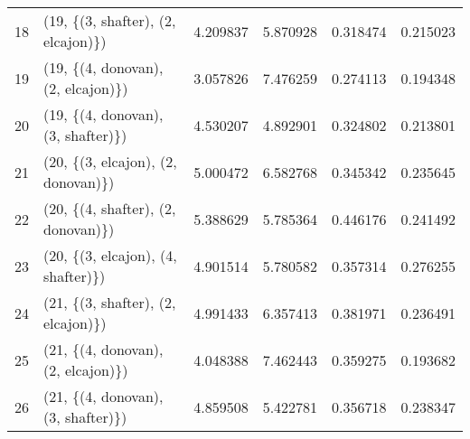 \begin{tabular}{llrrrr}
18 &  (19, \{(3, shafter), (2, elcajon)\}) &  4.209837 &  5.870928 &   0.318474 &  0.215023 \\
19 &  (19, \{(4, donovan), (2, elcajon)\}) &  3.057826 &  7.476259 &   0.274113 &  0.194348 \\
20 &  (19, \{(4, donovan), (3, shafter)\}) &  4.530207 &  4.892901 &   0.324802 &  0.213801 \\
21 &  (20, \{(3, elcajon), (2, donovan)\}) &  5.000472 &  6.582768 &   0.345342 &  0.235645 \\
22 &  (20, \{(4, shafter), (2, donovan)\}) &  5.388629 &  5.785364 &   0.446176 &  0.241492 \\
23 &  (20, \{(3, elcajon), (4, shafter)\}) &  4.901514 &  5.780582 &   0.357314 &  0.276255 \\
24 &  (21, \{(3, shafter), (2, elcajon)\}) &  4.991433 &  6.357413 &   0.381971 &  0.236491 \\
25 &  (21, \{(4, donovan), (2, elcajon)\}) &  4.048388 &  7.462443 &   0.359275 &  0.193682 \\
26 &  (21, \{(4, donovan), (3, shafter)\}) &  4.859508 &  5.422781 &   0.356718 &  0.238347 \\
\bottomrule
\end{tabular}
